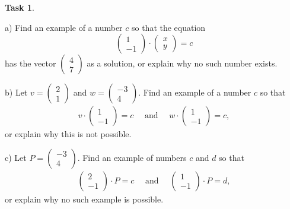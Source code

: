 \documentclass{tufte-book}
\theoremstyle{definition}
\newtheorem{task}{Task}
\begin{document}
\begin{task}
\begin{compactitem}
\item[a)] Find an example of a number $c$ so that the equation
\[
\begin{pmatrix} 1 \\ -1 \end{pmatrix} \cdot \begin{pmatrix} x \\ y \end{pmatrix} = c
\]
has the vector $\left(\begin{smallmatrix}4 \\ 7 \end{smallmatrix}\right)$ as a solution, or explain why no such number exists.
\item[b)] Let $v = \left(\begin{smallmatrix}2\\1\end{smallmatrix}\right)$ and $w=\left(\begin{smallmatrix}-3\\4\end{smallmatrix}\right)$. Find an example of a number $c$ so that 
\begin{gather*} 
v \cdot \begin{pmatrix}1\\-1\end{pmatrix} = c \quad\text{ and } \quad w \cdot \begin{pmatrix}1\\-1\end{pmatrix} = c, 
\end{gather*}
or explain why this is not possible.
\item[c)] Let $P = \left(\begin{smallmatrix}-3\\4\end{smallmatrix}\right)$. Find an example of numbers $c$ and $d$ so that 
\begin{gather*} \begin{pmatrix} 2\\-1\end{pmatrix}\cdot P = c \quad\text{ and } \quad \begin{pmatrix} 1\\-1\end{pmatrix}\cdot P = d, 
\end{gather*} 
or explain why no such example is possible.
\end{compactitem}
\end{task}
\end{document}
